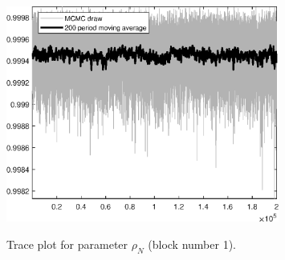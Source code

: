 \begin{figure}[H]
\centering
  \includegraphics[width=0.8\textwidth]{RBC_growth/graphs/TracePlot_rho_N_blck_1}\\
    \caption{Trace plot for parameter ${\rho_N}$ (block number 1).}
\end{figure}
